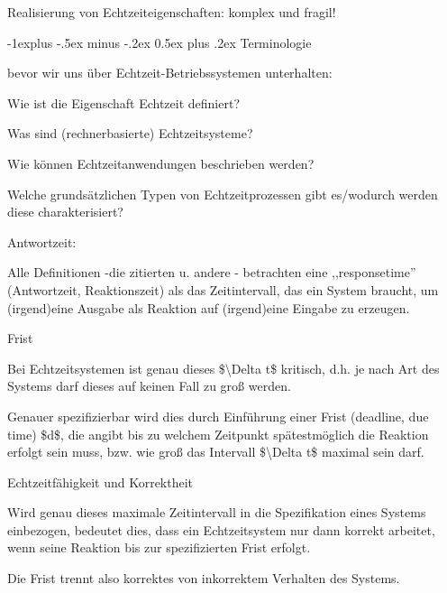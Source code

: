 \documentclass[a4paper]{article}
\makeatletter
\renewcommand{\subsection}{\@startsection{subsection}{2}{0mm}%
 {-1explus -.5ex minus -.2ex}%
 {0.5ex plus .2ex}%
 {\normalfont\normalsize\bfseries}}
\makeatother
\begin{document}
\begin{multicols}{3}
    Realisierung von Echtzeiteigenschaften: komplex und fragil!


    \subsection{Terminologie}

    bevor wir uns über Echtzeit-Betriebssystemen unterhalten:

    \begin{enumerate*}
        \item
        Wie ist die Eigenschaft Echtzeit definiert?
        \item
        Was sind (rechnerbasierte) Echtzeitsysteme?
        \item
        Wie können Echtzeitanwendungen beschrieben werden?
        \item
        Welche grundsätzlichen Typen von Echtzeitprozessen gibt es/wodurch
        werden diese charakterisiert?
    \end{enumerate*}

    Antwortzeit:

    \begin{itemize*}
        \item
        Alle Definitionen -die zitierten u. andere - betrachten eine
        ,,responsetime'' (Antwortzeit, Reaktionszeit) als das Zeitintervall,
        das ein System braucht, um (irgend)eine Ausgabe als Reaktion auf
        (irgend)eine Eingabe zu erzeugen.
    \end{itemize*}

    Frist

    \begin{itemize*}
        \item
        Bei Echtzeitsystemen ist genau dieses \$\textbackslash Delta t\$
        kritisch, d.h. je nach Art des Systems darf dieses auf keinen Fall zu
        groß werden.
        \item
        Genauer spezifizierbar wird dies durch Einführung einer Frist
        (deadline, due time) \$d\$, die angibt bis zu welchem Zeitpunkt
        spätestmöglich die Reaktion erfolgt sein muss, bzw. wie groß das
        Intervall \$\textbackslash Delta t\$ maximal sein darf.
    \end{itemize*}

    Echtzeitfähigkeit und Korrektheit

    \begin{itemize*}
        \item
        Wird genau dieses maximale Zeitintervall in die Spezifikation eines
        Systems einbezogen, bedeutet dies, dass ein Echtzeitsystem nur dann
        korrekt arbeitet, wenn seine Reaktion bis zur spezifizierten Frist
        erfolgt.
        \item
        Die Frist trennt also korrektes von inkorrektem Verhalten des Systems.
    \end{itemize*}


\end{multicols}
\end{document}
